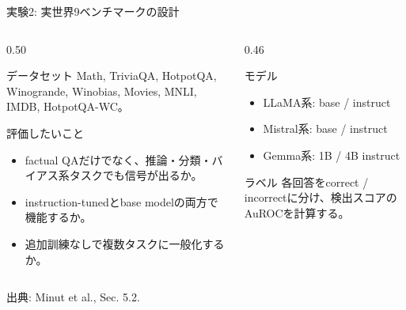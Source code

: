 \documentclass[dvipdfmx,uplatex,unicode,9pt,aspectratio=169]{beamer}
\newcommand{\source}[1]{\vfill{\tiny\color{GrayText}出典: #1}}
\begin{document}
\begin{frame}{実験2: 実世界9ベンチマークの設計}
\begin{columns}[T,onlytextwidth]
\begin{column}{0.50\linewidth}
\begin{block}{データセット}
Math, TriviaQA, HotpotQA, Winogrande, Winobias, Movies, MNLI, IMDB, HotpotQA-WC。
\end{block}
\begin{block}{評価したいこと}
\begin{itemize}
\item factual QAだけでなく、推論・分類・バイアス系タスクでも信号が出るか。
\item instruction-tunedとbase modelの両方で機能するか。
\item 追加訓練なしで複数タスクに一般化するか。
\end{itemize}
\end{block}
\end{column}
\begin{column}{0.46\linewidth}
\begin{block}{モデル}
\begin{itemize}
\item LLaMA系: base / instruct
\item Mistral系: base / instruct
\item Gemma系: 1B / 4B instruct
\end{itemize}
\end{block}
\begin{block}{ラベル}
各回答をcorrect / incorrectに分け、検出スコアのAuROCを計算する。
\end{block}
\end{column}
\end{columns}
\source{Minut et al., Sec. 5.2.}
\end{frame}
\end{document}
